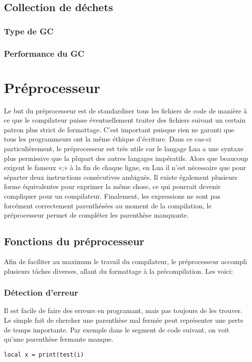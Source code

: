 \documentclass{article}
\begin{document}
\subsection{Collection de déchets}

\subsubsection{Type de GC}

\subsubsection{Performance du GC}

\newpage
\section{Préprocesseur}
Le but du préprocesseur est de standardiser tous les fichiers de code de manière à ce que le compilateur puisse éventuellement traiter des fichiers suivant un certain patron plus strict de formattage. C'est important puisque rien ne garanti que tous les programmeurs ont la même éthique d'écriture. Dans ce cas-ci particulièrement, le préprocesseur est très utile car le langage Lua a une syntaxe plus permissive que la plupart des autres langages impératifs. Alors que beaucoup exigent le fameux «;» à la fin de chaque ligne, en Lua il n'est nécessaire que pour séparter deux instructions consécutives ambiguës. Il existe également plusieurs forme équivalentes pour exprimer la même chose, ce qui pourrait devenir compliquer pour un compilateur. Finalement, les expressions ne sont pas forcément correctement parenthésées au moment de la compilation, le préprocesseur permet de compléter les parenthèse manquante.

\subsection{Fonctions du préprocesseur}
Afin de faciliter au maximum le travail du compilateur, le préprocesseur accompli plusieurs tâches diverses, allant du formattage à la précompilation. Les voici:

\subsubsection{Détection d'erreur}
Il est facile de faire des erreurs en programant, mais pas toujours de les trouver. Le simple fait de chercher une parenthèse mal fermée peut représenter une perte de temps importante. Par exemple dans le segment de code suivant, on voit qu'une parenthèse fermante manque.
\lstset{style = lua}
\begin{lstlisting}[caption={Mauvais parenthèsage},label=DescriptiveLabel]
  local x = print(test(i)
\end{lstlisting}
\end{document}
